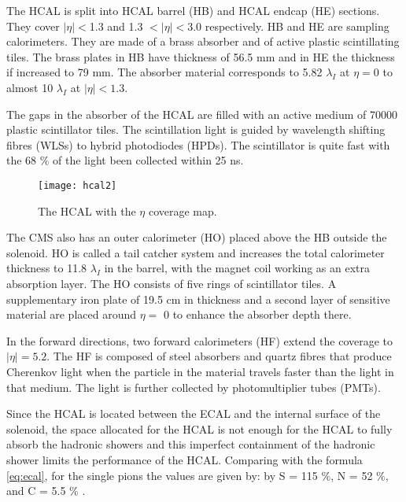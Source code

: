 \begin{normalsize}
The HCAL is split into HCAL barrel (HB) and HCAL endcap (HE) sections. They cover $ |\eta| < $1.3 and 1.3 $< |\eta| < $3.0 respectively. HB and HE are sampling calorimeters. They are made of a brass absorber and of active plastic scintillating tiles. The brass plates in HB have thickness of 56.5 mm and in HE the thickness if increased to 79 mm. The absorber material corresponds to 5.82 $\lambda_I$ at $\eta = 0$ to almost 10 $\lambda_I$ at $|\eta| < 1.3$.

The gaps in the absorber of the HCAL are filled with an active medium of 70000 plastic scintillator tiles. The scintillation light is guided by wavelength shifting fibres (WLSs) to hybrid photodiodes (HPDs). The scintillator is quite fast with the 68 $\%$ of the light been collected within 25 ns.

\begin{figure}[H]
  \centering
  \texttt{[image: hcal2]}
  \caption[The HCAL]{The HCAL with the $\eta$ coverage map.}
  \label{hcal2}
\end{figure}


The CMS also has an outer calorimeter (HO) placed above the HB outside the solenoid. HO is called a tail catcher system and increases the total calorimeter thickness to 11.8 $\lambda_I$ in the barrel, with the magnet coil working as an extra absorption layer. The HO consists of five rings of scintillator tiles. A supplementary iron plate of 19.5 cm in thickness and a second layer of sensitive material are placed around $\eta =$ 0 to enhance the absorber depth there. 

In the forward directions, two forward calorimeters (HF) extend the coverage to  $|\eta| = 5.2$. The HF is composed of steel absorbers and quartz fibres that produce Cherenkov light when the particle in the material travels faster than the light in that medium. The light is further collected by photomultiplier tubes (PMTs). 


Since the HCAL is located between the ECAL and the internal surface of the solenoid, the space allocated for the HCAL is not enough for the HCAL to fully absorb the hadronic showers and this imperfect containment of the hadronic shower limits the performance of the HCAL. Comparing with the formula \ref{eq:ecal}, for the single pions the values are given by:  by S = 115 $\%$, N = 52  $\%$, and C = 5.5 $\%$ \cite{Baiatian_hcal}.






\end{normalsize}
